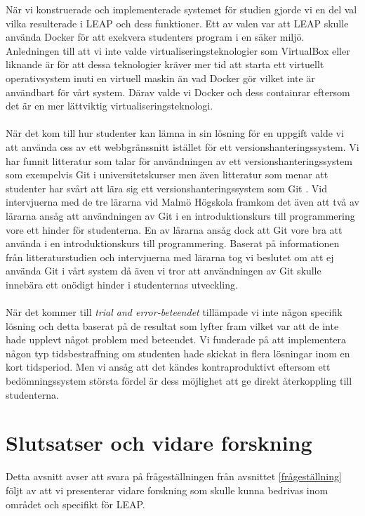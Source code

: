 \documentclass[a4paper,11pt]{article}
\begin{document}
{När vi konstruerade och implementerade systemet för studien gjorde vi en del val vilka resulterade i LEAP och dess funktioner. Ett av valen var att LEAP skulle använda Docker för att exekvera studenters program i en säker miljö. Anledningen till att vi inte valde virtualiseringsteknologier som VirtualBox eller liknande är för att dessa teknologier kräver mer tid att starta ett virtuellt operativsystem inuti en virtuell maskin än vad Docker gör \cite{stastna_security_2015} vilket inte är användbart för vårt system. Därav valde vi Docker och dess containrar eftersom det är en mer lättviktig virtualiseringsteknologi.
\\
\\
När det kom till hur studenter kan lämna in sin lösning för en uppgift valde vi att använda oss av ett webbgränssnitt istället för ett versionshanteringssystem. Vi har funnit litteratur som talar för användningen av ett versionshanteringssystem som exempelvis Git i universitetskurser \cite{ermolayev} \cite{kelleher} men även litteratur som menar att studenter har svårt att lära sig ett versionshanteringssystem som Git \cite{haaranen}. Vid intervjuerna med de tre lärarna vid Malmö Högskola framkom det även att två av lärarna ansåg att användningen av Git i en introduktionskurs till programmering vore ett hinder för studenterna. En av lärarna ansåg dock att Git vore bra att använda i en introduktionskurs till programmering. Baserat på informationen från litteraturstudien och intervjuerna med lärarna tog vi beslutet om att ej använda Git i vårt system då även vi tror att användningen av Git skulle innebära ett onödigt hinder i studenternas utveckling.
\\
\\
När det kommer till \textit{trial and error-beteendet} tillämpade vi inte någon specifik lösning och detta baserat på de resultat som \cite{caiza_7} lyfter fram vilket var att de inte hade upplevt något problem med beteendet. Vi funderade på att implementera någon typ tidsbestraffning om studenten hade skickat in flera lösningar inom en kort tidsperiod. Men vi ansåg att det kändes kontraproduktivt eftersom ett bedömningssystem största fördel är dess möjlighet att ge direkt återkoppling till studenterna.

\newpage
\section{Slutsatser och vidare forskning}

Detta avsnitt avser att svara på frågeställningen från avsnittet \ref{frågeställning} följt av att vi presenterar vidare forskning som skulle kunna bedrivas inom området och specifikt för LEAP.

}
\end{document}
